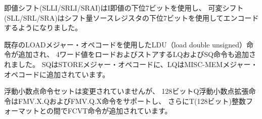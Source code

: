 即値シフト(SLLI/SRLI/SRAI)はI即値の下位7ビットを使用し、
可変シフト(SLL/SRL/SRA)はシフト量ソースレジスタの下位7ビットを使用してエンコードするようになりました。

\begin{comment}
A LDU (load double unsigned) instruction is added using the existing
LOAD major opcode, along with new LQ and SQ instructions to load and
store quadword values.  SQ is added to the STORE major opcode, while
LQ is added to the MISC-MEM major opcode.
\end{comment}

既存のLOADメジャー・オペコードを使用したLDU（load double unsigned）命令が追加され、
4ワード値をロードおよびストアするLQおよびSQ命令も追加されました。
SQはSTOREメジャー・オペコードに、LQはMISC-MEMメジャー・オペコードに追加されています。

\begin{comment}
The floating-point instruction set is unchanged, although the 128-bit
Q floating-point extension can now support FMV.X.Q and FMV.Q.X
instructions, together with additional FCVT instructions to and from
the T (128-bit) integer format.
\end{comment}

浮動小数点命令セットは変更されていませんが、
128ビットQ浮動小数点拡張命令はFMV.X.QおよびFMV.Q.X命令をサポートし、
さらにT(128ビット)整数フォーマットとの間でFCVT命令が追加されています。
